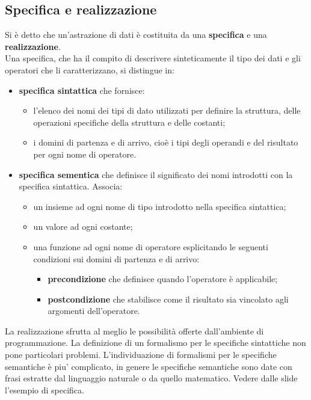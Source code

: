 \documentclass[12pt]{report}
\begin{document}
	\subsection{Specifica e realizzazione}
	Si è detto che un'astrazione di dati è costituita da una \textbf{specifica} e una \textbf{realizzazione}. \\
	Una specifica, che ha il compito di descrivere sinteticamente il tipo dei dati e gli operatori che li caratterizzano, si distingue in:
	\begin{itemize}
		\item \textbf{specifica sintattica} che fornisce:
		\begin{itemize}
			\item l'elenco dei nomi dei tipi di dato utilizzati per definire la struttura, delle operazioni specifiche della struttura e delle costanti;
			\item i domini di partenza e di arrivo, cioè i tipi degli operandi e del risultato per ogni nome di operatore.
		\end{itemize}
		\item \textbf{specifica sementica} che definisce il significato dei nomi introdotti con la specifica sintattica. Associa:
		\begin{itemize}
			\item un insieme ad ogni nome di tipo introdotto nella specifica sintattica;
			\item un valore ad ogni costante;
			\item una funzione ad ogni nome di operatore esplicitando le seguenti condizioni sui domini di partenza e di arrivo:
			\begin{itemize}
				\item \textbf{precondizione} che definisce quando l'operatore è applicabile;
				\item \textbf{postcondizione} che stabilisce come il risultato sia vincolato agli argomenti dell'operatore.
			\end{itemize}
		\end{itemize}
	\end{itemize}
	La realizzazione sfrutta al meglio le possibilità offerte dall'ambiente di programmazione. La definizione di un formalismo per le specifiche sintattiche non pone particolari problemi. L'individuazione di formalismi per le specifiche semantiche è piu' complicato, in genere le specifiche semantiche sono date con frasi estratte dal linguaggio naturale o da quello matematico. Vedere dalle slide l'esempio di specifica. \\
\end{document}
